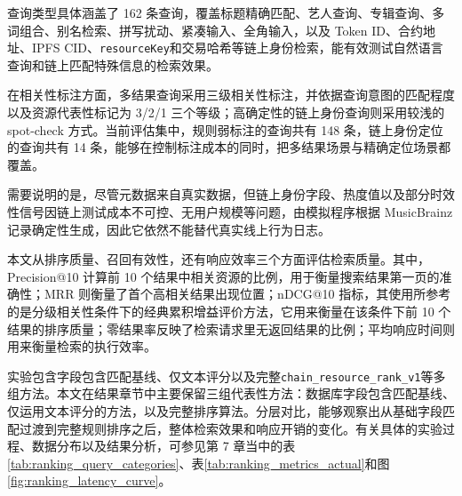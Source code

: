 查询类型具体涵盖了 162 条查询，覆盖标题精确匹配、艺人查询、专辑查询、多词组合、别名检索、拼写扰动、紧凑输入、全角输入，以及 Token ID、合约地址、IPFS CID、\texttt{resourceKey}和交易哈希等链上身份检索，能有效测试自然语言查询和链上匹配特殊信息的检索效果。

在相关性标注方面，多结果查询采用三级相关性标注，并依据查询意图的匹配程度以及资源代表性标记为 3/2/1 三个等级；高确定性的链上身份查询则采用较浅的 spot-check 方式。当前评估集中，规则弱标注的查询共有 148 条，链上身份定位的查询共有 14 条，能够在控制标注成本的同时，把多结果场景与精确定位场景都覆盖。


需要说明的是，尽管元数据来自真实数据，但链上身份字段、热度值以及部分时效性信号因链上测试成本不可控、无用户规模等问题，由模拟程序根据 MusicBrainz 记录确定性生成，因此它依然不能替代真实线上行为日志。

本文从排序质量、召回有效性，还有响应效率三个方面评估检索质量。其中，Precision@10 计算前 10 个结果中相关资源的比例，用于衡量搜索结果第一页的准确性；MRR 则衡量了首个高相关结果出现位置；nDCG@10 指标，其使用所参考的是分级相关性条件下的经典累积增益评价方法\cite{Jarvelin2002CG}，它用来衡量在该条件下前 10 个结果的排序质量；零结果率反映了检索请求里无返回结果的比例；平均响应时间则用来衡量检索的执行效率。

实验包含字段包含匹配基线、仅文本评分以及完整\texttt{chain\_resource\_rank\_v1}等多组方法。本文在结果章节中主要保留三组代表性方法：数据库字段包含匹配基线、仅运用文本评分的方法，以及完整排序算法。分层对比，能够观察出从基础字段匹配过渡到完整规则排序之后，整体检索效果和响应开销的变化。有关具体的实验过程、数据分布以及结果分析，可参见第 7 章当中的表\ref{tab:ranking_query_categories}、表\ref{tab:ranking_metrics_actual}和图\ref{fig:ranking_latency_curve}。

